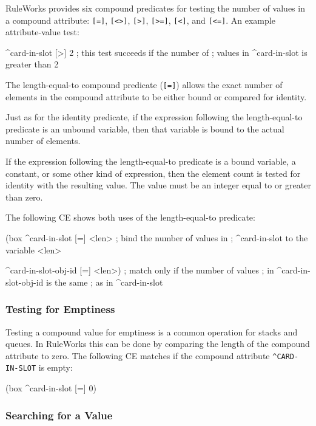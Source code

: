 RuleWorks provides six compound predicates for testing the number of
values in a compound attribute: \verb|[=]|, \verb|[<>]|, \verb|[>]|,
\verb|[>=]|, \verb|[<]|, and \verb|[<=]|.  An example attribute-value
test:
\begin{qv}
^card-in-slot [>] 2 ; this test succeeds if the number of
                    ; values in ^card-in-slot is greater than 2
\end{qv}
                  
The length-equal-to compound predicate (\verb|[=]|) allows the exact
number of elements in the compound attribute to be either bound or
compared for identity.

Just as for the identity predicate, if the expression following the
length-equal-to predicate is an unbound variable, then that variable
is bound to the actual number of elements.

If the expression following the length-equal-to predicate is a bound
variable, a constant, or some other kind of expression, then the
element count is tested for identity with the resulting value. The
value must be an integer equal to or greater than zero.

The following CE shows both uses of the length-equal-to predicate:
\begin{qv}
(box ^card-in-slot [=] <len> ; bind the number of values in
                             ; ^card-in-slot to the variable <len>

^card-in-slot-obj-id [=] <len>) ; match only if the number of values
                                ; in ^card-in-slot-obj-id is the same
                                ; as in ^card-in-slot
\end{qv}

\subsubsection*{Testing for Emptiness}

Testing a compound value for emptiness is a common operation for
stacks and queues. In RuleWorks this can be done by comparing the
length of the compound attribute to zero. The following CE matches if
the compound attribute \verb|^CARD-IN-SLOT| is empty:
\begin{qv}
(box ^card-in-slot [=] 0)
\end{qv}
   
\subsubsection*{Searching for a Value}

